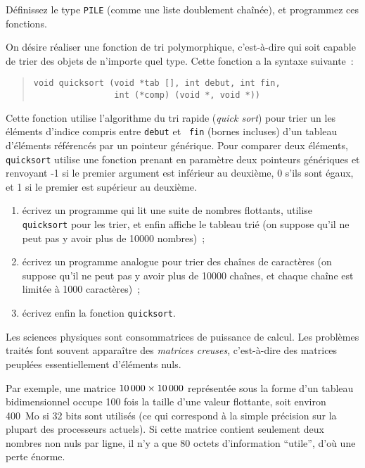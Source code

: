 Définissez le type {\tt PILE} (comme une liste doublement chaînée),
et programmez ces fonctions.


\question

On désire réaliser une fonction de tri polymorphique, c'est-à-dire qui
soit capable de trier des objets de n'importe quel type. Cette fonction
a la syntaxe suivante~:

\begin {quote}
\begin {verbatim}
void quicksort (void *tab [], int debut, int fin,
                int (*comp) (void *, void *))
\end{verbatim}
\end {quote}

Cette fonction utilise l'algorithme du tri rapide ({\em quick sort})
pour trier un les éléments d'indice compris entre {\tt debut} et {\tt
fin} (bornes incluses) d'un tableau d'éléments référencés par un
pointeur générique.  Pour comparer deux éléments, {\tt quicksort}
utilise une fonction prenant en paramètre deux pointeurs génériques et
renvoyant -1 si le premier argument est inférieur au deuxième, 0 s'ils
sont égaux, et 1 si le premier est supérieur au deuxième.

\begin {enumerate}
    \item écrivez un programme qui lit une suite de nombres flottants,
	utilise {\tt quicksort} pour les trier, et enfin affiche le
	tableau trié (on suppose qu'il ne peut pas y avoir plus de 10000
	nombres)~;

    \item écrivez un programme analogue pour trier des chaînes de
	caractères (on suppose qu'il ne peut pas y avoir plus de 10000
	chaînes, et chaque chaîne est limitée à 1000 caractères)~;

    \item écrivez enfin la fonction {\tt quicksort}.

\end {enumerate}


\question

Les sciences physiques sont consommatrices de puissance de calcul.  Les
problèmes traités font souvent apparaître des {\em matrices creuses},
c'est-à-dire des matrices peuplées essentiellement d'éléments nuls.

Par exemple, une matrice $10\thinspace000 \times 10\thinspace000$
représentée sous la forme d'un tableau bidimensionnel occupe
100 fois la taille d'une valeur flottante,
soit environ 400~Mo si 32 bits sont utilisés (ce qui correspond à la
simple précision sur la plupart des processeurs actuels).  Si cette
matrice contient seulement deux nombres non nuls par ligne, il n'y a que
80 octets d'information ``utile'', d'où une perte énorme.


